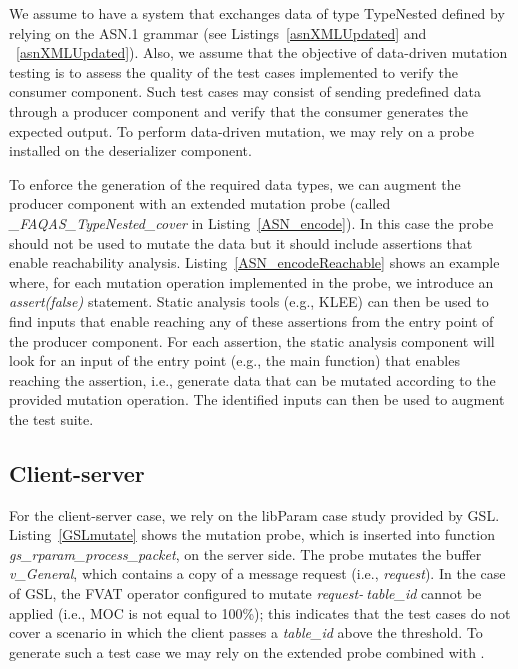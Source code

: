 We assume to have a system that exchanges data of type TypeNested defined by relying on the ASN.1 grammar (see Listings~\ref{asnXMLUpdated} and ~\ref{asnXMLUpdated}). Also, we assume that the objective of data-driven mutation testing is to assess the quality of the test cases implemented to verify the consumer component. 
Such test cases may consist of sending predefined data through a producer component and verify that the consumer generates the expected output. 
To perform data-driven mutation, we may rely on a probe installed on the deserializer component. 


To enforce the generation of the required data types, we can augment the producer component with an extended mutation probe (called \emph{\_FAQAS\_TypeNested\_cover} in Listing~\ref{ASN_encode}). In this case the probe should not be used to mutate the data but it should include assertions that enable reachability analysis. Listing~\ref{ASN_encodeReachable} shows an example where, for each mutation operation implemented in the probe, we introduce an \emph{assert(false)} statement. Static analysis tools (e.g., KLEE)  can then be used to find inputs that enable reaching any of these assertions from the entry point of the producer component. For each assertion, the static analysis component will look for an input of the entry point (e.g., the main function) that enables reaching the assertion, i.e., generate data that can be mutated according to the provided mutation operation. The identified inputs can then be used to augment the test suite.



\clearpage
\subsection{Client-server}

\STARTCHANGEDWPT

For the client-server case, we rely on the libParam case study provided by GSL. Listing~\ref{GSLmutate} shows the mutation probe, which is inserted into function \emph{gs\_rparam\_process\_packet}, on the server side. The probe mutates the buffer \emph{v\_General}, which contains a copy of a message request (i.e., \emph{request}). In the case of GSL, the FVAT operator configured to mutate \emph{request-$\>$table\_id} cannot be applied (i.e., MOC is not equal to 100\%); this indicates that the test cases do not cover a scenario in which the client passes a \emph{table\_id} above the threshold. To generate such a test case we may rely on the extended probe combined with . 

